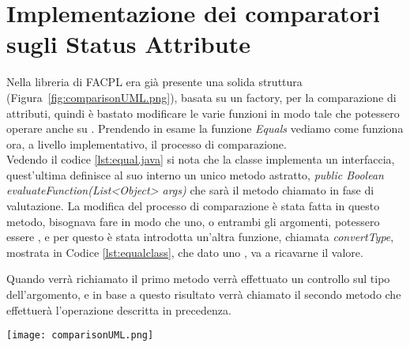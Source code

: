 

\section{Implementazione dei comparatori sugli Status Attribute} %
\label{sec:implementazione_dei_comparatori_sugli_status_attribute}
Nella libreria di FACPL era già presente una solida struttura (Figura~\ref{fig:comparisonUML.png}), basata su un factory, per la comparazione di attributi, quindi è bastato modificare le varie funzioni in modo tale che potessero operare anche su \statusattribute.
Prendendo in esame la funzione \textit{Equals} vediamo come funziona ora, a livello implementativo, il processo di comparazione.\\ 
Vedendo il codice \ref{lst:equal.java} si nota che la classe implementa un interfaccia, quest'ultima definisce al suo interno un unico metodo astratto, \textit{public Boolean evaluateFunction(List<Object> args)} che sarà il metodo chiamato in fase di valutazione.
La modifica del processo di comparazione è stata fatta in questo metodo, bisognava fare in modo che uno, o entrambi gli argomenti, potessero essere \statusattribute, e per questo è stata introdotta un'altra funzione, chiamata \textit{convertType}, mostrata in Codice \ref{lst:equalclass}, che dato uno \statusattribute, va a ricavarne il valore.\\ \par
Quando verrà richiamato il primo metodo verrà effettuato un controllo sul tipo dell'argomento, e in base a questo risultato verrà chiamato il secondo metodo che effettuerà l'operazione descritta in precedenza.



\begin{sidewaysfigure}
    \centering
	\texttt{[image: comparisonUML.png]}
    \caption{Grafico UML per la gerarchia di classi usate nella comparazione}
    \label{fig:comparisonUML.png}
\end{sidewaysfigure}


